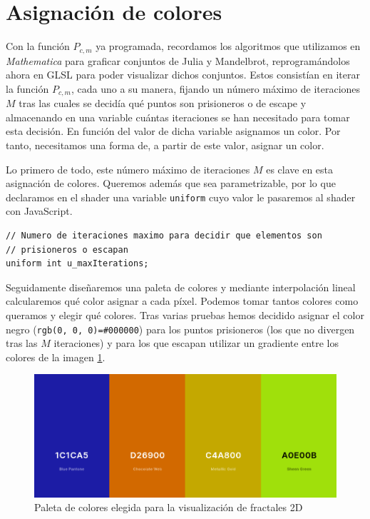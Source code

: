 \section{Asignación de colores}
\label{section:colores}

Con la función $P_{c,m}$ ya programada, recordamos los algoritmos que utilizamos en \textit{Mathematica} para graficar conjuntos de Julia y Mandelbrot, reprogramándolos ahora en GLSL para poder visualizar dichos conjuntos. Estos consistían en iterar la función $P_{c,m}$, cada uno a su manera, fijando un número máximo de iteraciones $M$ tras las cuales se decidía qué puntos son prisioneros o de escape y almacenando en una variable cuántas iteraciones se han necesitado para tomar esta decisión. En función del valor de dicha variable asignamos un color. Por tanto, necesitamos una forma de, a partir de este valor, asignar un color.

Lo primero de todo, este número máximo de iteraciones $M$ es clave en esta asignación de colores. Queremos además que sea parametrizable, por lo que declaramos en el shader una variable \verb|uniform| cuyo valor le pasaremos al shader con JavaScript.

\begin{lstlisting}
// Numero de iteraciones maximo para decidir que elementos son
// prisioneros o escapan
uniform int u_maxIterations;
\end{lstlisting}

Seguidamente diseñaremos una paleta de colores y mediante interpolación lineal calcularemos qué color asignar a cada píxel. Podemos tomar tantos colores como queramos y elegir qué colores. Tras varias pruebas hemos decidido asignar el color negro (\verb|rgb(0, 0, 0)=#000000|) para los puntos prisioneros (los que no divergen tras las $M$ iteraciones) y para los que escapan utilizar un gradiente entre los colores de la imagen \ref{fig:paleta}.

\begin{figure} [ht]
    \centering
    \includegraphics[scale = 0.4]{img/C7/paleta.png}
    \caption{Paleta de colores elegida para la visualización de fractales 2D}
    \label{fig:paleta}
\end{figure}

